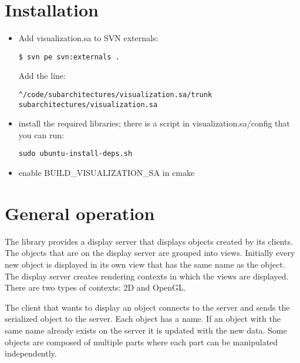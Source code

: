 
\section{Installation}

\begin{itemize}
   \item Add visualization.sa to SVN externals:
   \begin{Verbatim}[fontsize=\scriptsize,gobble=6]
      $ svn pe svn:externals .
   \end{Verbatim}
   Add the line:
   \begin{Verbatim}[fontsize=\scriptsize,gobble=6]
      ^/code/subarchitectures/visualization.sa/trunk subarchitectures/visualization.sa
   \end{Verbatim}

   \item install the required libraries; there is a script in visualization.sa/config
   that you can run:
   \begin{Verbatim}[fontsize=\scriptsize,gobble=6]
      sudo ubuntu-install-deps.sh
   \end{Verbatim}

   \item enable BUILD\_VISUALIZATION\_SA in cmake
\end{itemize}

\section{General operation}

The library provides a display server that displays objects created by its
clients.  The objects that are on the display server are grouped into views.
Initially every new object is displayed in its own view that has the same name
as the object.
The display server creates rendering contexts in which the views are displayed.
There are two types of contexts: 2D and OpenGL.

The client that wants to display an object connects to the server and sends the
serialized object to the server. Each object has a name. If an object with the
same name already exists on the server it is updated with the new data. Some
objects are composed of multiple parts where each part can be manipulated
independently.

